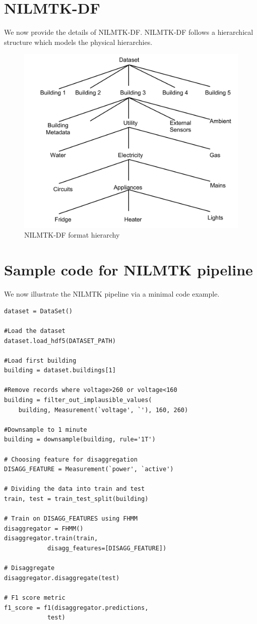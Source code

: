 \documentclass{sig-alternate}
\begin{document}

{\scriptsize
}

\newpage
\appendix
\section{NILMTK-DF}
We now provide the details of NILMTK-DF. NILMTK-DF follows a hierarchical structure which models the physical hierarchies. 

\begin{figure}
\centering 
\includegraphics[scale=0.5]{figures/data_format.pdf}
\caption{NILMTK-DF format hierarchy}
\label{fig:nilmtk-format}
\end{figure}

\section{Sample code for NILMTK pipeline}
We now illustrate the NILMTK pipeline via a minimal code example.

\begin{verbatim}
dataset = DataSet()

#Load the dataset
dataset.load_hdf5(DATASET_PATH)

#Load first building
building = dataset.buildings[1]

#Remove records where voltage>260 or voltage<160
building = filter_out_implausible_values(
    building, Measurement(`voltage', `'), 160, 260)
    
#Downsample to 1 minute
building = downsample(building, rule='1T')

# Choosing feature for disaggregation
DISAGG_FEATURE = Measurement(`power', `active')

# Dividing the data into train and test
train, test = train_test_split(building)

# Train on DISAGG_FEATURES using FHMM
disaggregator = FHMM()
disaggregator.train(train, 
            disagg_features=[DISAGG_FEATURE])
            
# Disaggregate
disaggregator.disaggregate(test)

# F1 score metric
f1_score = f1(disaggregator.predictions, 
            test)
\end{verbatim}
\end{document}
